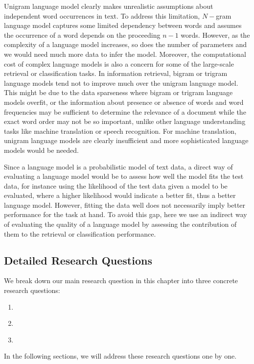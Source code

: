 Unigram language model clearly makes unrealistic assumptions about independent word occurrences in text. To address this limitation, $N-$gram language model captures some limited dependency between words and assumes the occurrence of a word depends on the proceeding $n-1$ words.  However, as the complexity of a language model increases, so does the number of parameters and we would need much more data to infer the model. Moreover, the computational cost of complex language models is also a concern for some of the large-scale retrieval or classification tasks. 
%
In information retrieval, bigram or trigram language models tend not to improve much over the unigram language model. This might be due to the data sparseness where bigram or trigram language models overfit, or the information about presence or absence of words and word frequencies may be sufficient to determine the relevance of a document while the exact word order may not be so important, unlike other language understanding tasks like machine translation or speech recognition. For machine translation, unigram language models are clearly insufficient and more sophisticated language models would be needed. 

Since a language model is a probabilistic model of text data, a direct way of evaluating a language model would be to assess how well the model fits the test data, for instance using the likelihood of the test data given a model to be evaluated, where a higher likelihood would indicate a better fit, thus a better language model.
However, fitting the data well does not necessarily imply better performance for the task at hand. To avoid this gap, here we use an indirect way of evaluating the quality of a language model by assessing the contribution of them to the retrieval or classification performance.

\subsection{Detailed Research Questions}
We break down our main research question in this chapter into three concrete research questions:
\begin{resqbox}
\begin{enumerate}
\item[\textbf{\resqname{c2.1}}] \emph{}
\item[\textbf{\resqname{c2.2}}] \emph{}
\item[\textbf{\resqname{c2.3}}] \emph{}
\end{enumerate}
\end{resqbox}
In the following sections, we will address these research questions one by one.

